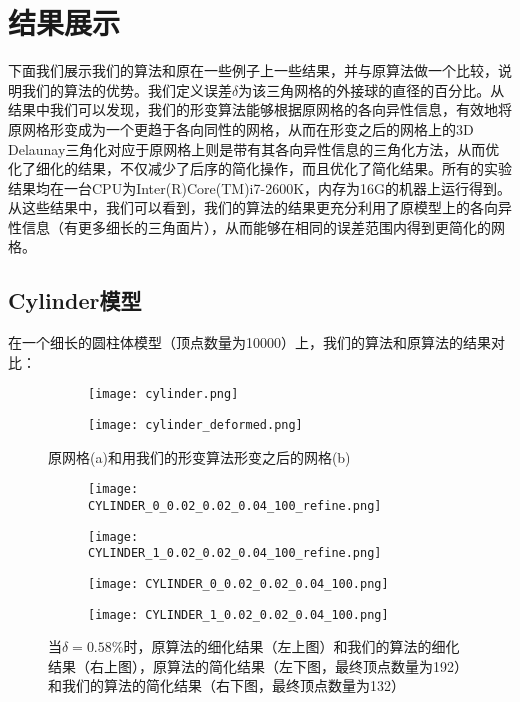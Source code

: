 \chapter{结果展示}
下面我们展示我们的算法和原在一些例子上一些结果，并与原算法做一个比较，说明我们的算法的优势。我们定义误差$\delta$为该三角网格的外接球的直径的百分比。从结果中我们可以发现，我们的形变算法能够根据原网格的各向异性信息，有效地将原网格形变成为一个更趋于各向同性的网格，从而在形变之后的网格上的3D Delaunay三角化对应于原网格上则是带有其各向异性信息的三角化方法，从而优化了细化的结果，不仅减少了后序的简化操作，而且优化了简化结果。所有的实验结果均在一台CPU为Inter(R)Core(TM)i7-2600K，内存为16G的机器上运行得到。从这些结果中，我们可以看到，我们的算法的结果更充分利用了原模型上的各向异性信息（有更多细长的三角面片），从而能够在相同的误差范围内得到更简化的网格。

\section{Cylinder模型}
在一个细长的圆柱体模型（顶点数量为10000）上，我们的算法和原算法的结果对比：
\begin{figure}[htbp]
  \centering
  \begin{subfigure}[b]{0.4\textwidth}
    \texttt{[image: cylinder.png]}
    \end{subfigure}
    \begin{subfigure}[b]{0.4\textwidth}
      \texttt{[image: cylinder\_deformed.png]}
    \end{subfigure}
    \caption[Cylinder形变结果]{原网格(a)和用我们的形变算法形变之后的网格(b)}
    \label{fig:cylinder-deform}
\end{figure}


\begin{figure}[htbp]
  \centering
  \begin{subfigure}[b]{0.4\textwidth}
    \texttt{[image: CYLINDER\_0\_0.02\_0.02\_0.04\_100\_refine.png]}
  \end{subfigure}
  \begin{subfigure}[b]{0.4\textwidth}
    \texttt{[image: CYLINDER\_1\_0.02\_0.02\_0.04\_100\_refine.png]}
  \end{subfigure}
  \begin{subfigure}[b]{0.4\textwidth}
    \texttt{[image: CYLINDER\_0\_0.02\_0.02\_0.04\_100.png]}
  \end{subfigure}
  \begin{subfigure}[b]{0.4\textwidth}
    \texttt{[image: CYLINDER\_1\_0.02\_0.02\_0.04\_100.png]}
  \end{subfigure}
  \caption[当$\delta=0.58\%$时Cylinder结果对比]{当$\delta=0.58\%$时，原算法的细化结果（左上图）和我们的算法的细化结果（右上图），原算法的简化结果（左下图，最终顶点数量为192）和我们的算法的简化结果（右下图，最终顶点数量为132）}
  \label{fig:cylinder-res1}
\end{figure}


